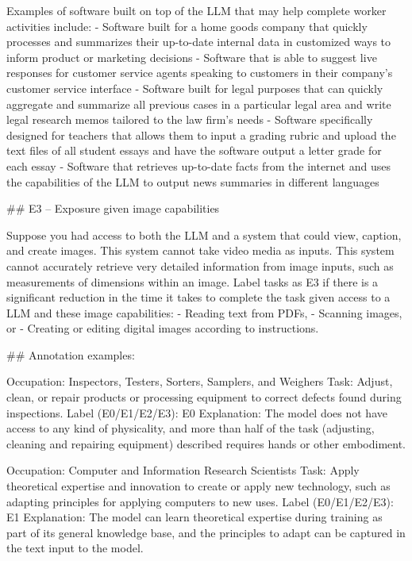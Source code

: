 Examples of software built on top of the LLM that may help complete worker activities include: 
- Software built for a home goods company that quickly processes and summarizes their up-to-date internal data in customized ways to inform product or marketing decisions 
- Software that is able to suggest live responses for customer service agents speaking to customers in their company’s customer service interface
- Software built for legal purposes that can quickly aggregate and summarize all previous cases in a particular legal area and write legal research memos tailored to the law firm’s needs
- Software specifically designed for teachers that allows them to input a grading rubric and upload the text files of all student essays and have the software output a letter grade for each essay 
- Software that retrieves up-to-date facts from the internet and uses the capabilities of the LLM to output news summaries in different languages

\#\# E3 – Exposure given image capabilities

Suppose you had access to both the LLM and a system that could view, caption, and create images. This system cannot take video media as inputs. This system cannot accurately retrieve very detailed information from image inputs, such as measurements of dimensions within an image. Label tasks as E3 if there is a significant reduction in the time it takes to complete the task given access to a LLM and these image capabilities:
- Reading text from PDFs, 
- Scanning images, or
- Creating or editing digital images according to instructions.

\#\# Annotation examples: 

Occupation: Inspectors, Testers, Sorters, Samplers, and Weighers
Task: Adjust, clean, or repair products or processing equipment to correct defects found during inspections.
Label (E0/E1/E2/E3): E0
Explanation: The model does not have access to any kind of physicality, and more than half of the task (adjusting, cleaning and repairing equipment) described requires hands or other embodiment.

Occupation: Computer and Information Research Scientists
Task: Apply theoretical expertise and innovation to create or apply new technology, such as adapting principles for applying computers to new uses.
Label (E0/E1/E2/E3): E1
Explanation: The model can learn theoretical expertise during training as part of its general knowledge base, and the principles to adapt can be captured in the text input to the model.

